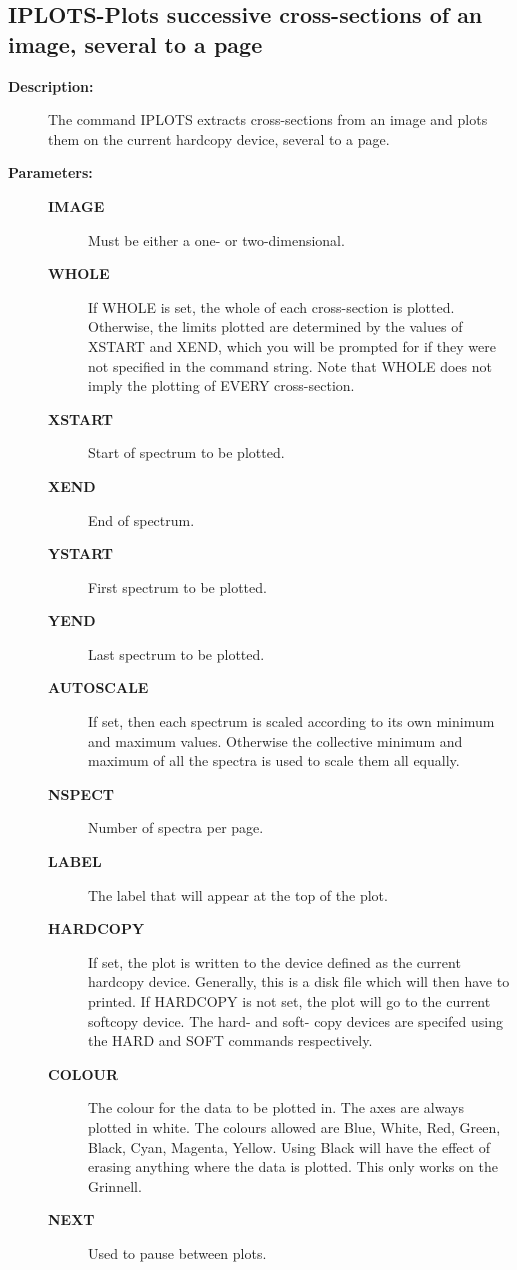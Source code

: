 \subsection{IPLOTS-\label{IPLOTS}Plots successive cross-sections of an image, several to a page}
\begin{description}

\item [{\bf Description:}]
 The command IPLOTS extracts cross-sections from an image
 and plots them on the current hardcopy device, several
 to a page.

\item [{\bf Parameters:}]
\begin{description}
\item [{\bf IMAGE}]
 Must be either a one- or two-dimensional.
\item [{\bf WHOLE}]
 If WHOLE is set, the whole of each cross-section is plotted.
 Otherwise, the limits plotted are determined by the values of XSTART
 and XEND, which you will be prompted for if they were not specified
 in the command string.  Note that WHOLE does not imply the plotting
 of EVERY cross-section.
\item [{\bf XSTART}]
 Start of spectrum to be plotted.
\item [{\bf XEND}]
 End of spectrum.
\item [{\bf YSTART}]
 First spectrum to be plotted.
\item [{\bf YEND}]
 Last spectrum to be plotted.
\item [{\bf AUTOSCALE}]
 If set, then each spectrum is scaled according to its own minimum
 and maximum values. Otherwise the collective minimum and maximum of
 all the spectra is used to scale them all equally.
\item [{\bf NSPECT}]
 Number of spectra per page.
\item [{\bf LABEL}]
 The label that will appear at the top of the plot.
\item [{\bf HARDCOPY}]
 If set, the plot is written to the device defined as the current
 hardcopy device.  Generally, this is a disk file which will then
 have to printed. If HARDCOPY is not set, the plot will go to the
 current softcopy device.  The hard- and soft- copy devices are
 specifed using the HARD and SOFT commands respectively.
\item [{\bf COLOUR}]
 The colour for the data to be plotted in.
 The axes are always plotted in white.  The colours allowed are Blue,
 White, Red, Green, Black, Cyan, Magenta, Yellow.  Using Black will
 have the effect of erasing anything where the data is plotted.  This
 only works on the Grinnell.
\item [{\bf NEXT}]
 Used to pause between plots.
\end{description}


\end{description}
